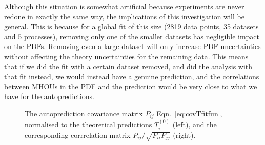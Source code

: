Although this situation is somewhat artificial because experiments are never redone in exactly the same way, the implications of this investigation will be general. This is because for a global fit of this size (2819 data points, 35 datasets and 5 processes), removing only one of the smaller datasets has negligible impact on the PDFs. Removing even a large dataset will only increase PDF uncertainties without affecting the theory uncertainties for the remaining data. This means that if we did the fit with a certain dataset removed, and did the analysis with that fit instead, we would instead have a genuine prediction, and the correlations between MHOUs in the PDF and the prediction would be very close to what we have for the autopredictions.
\begin{figure}[h]
    \begin{center}
  \end{center}
  \vspace{-0.55cm}
  \caption{The autoprediction covariance matrix $P_{ij}$ Eqn.~\ref{eq:covTfitfun}, normalised to the theoretical predictions $T^{(0)}_i$ (left), and the corresponding corrrelation matrix $P_{ij}/\sqrt{P_{ii}P_{jj}}$ (right).}
  \label{fig:P}
\end{figure}
